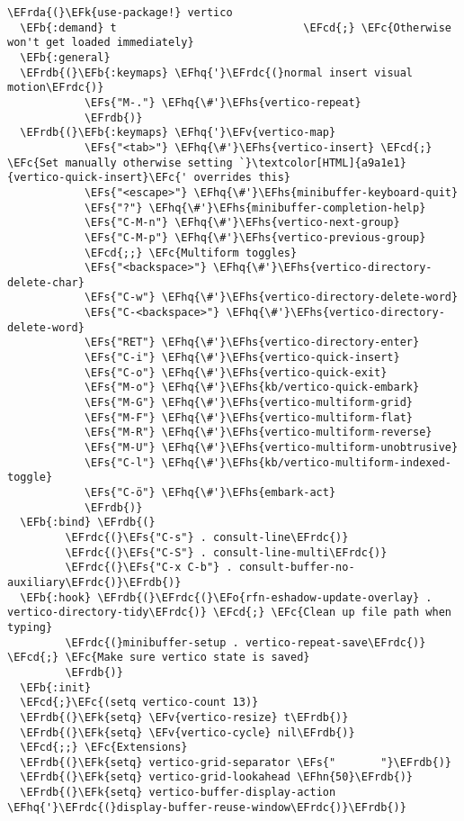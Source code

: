 \documentclass[a4wide,10pt]{article}
\newcommand{\EFc}[1]{\textcolor{EFc}{#1}} %
\newcommand{\EFcd}[1]{\textcolor{EFcd}{#1}} %
\newcommand{\EFs}[1]{\textcolor{EFs}{#1}} %
\newcommand{\EFk}[1]{\textcolor{EFk}{#1}} %
\newcommand{\EFb}[1]{\textcolor{EFb}{#1}} %
\newcommand{\EFv}[1]{\textcolor{EFv}{#1}} %
\newcommand{\EFo}[1]{\textcolor{EFo}{#1}} %
\newcommand{\EFhn}[1]{\textcolor{EFhn}{\textbf{#1}}} %
\newcommand{\EFhq}[1]{\textcolor{EFhq}{#1}} %
\newcommand{\EFhs}[1]{\textcolor{EFhs}{#1}} %
\newcommand{\EFrda}[1]{\textcolor{EFrda}{#1}} %
\newcommand{\EFrdb}[1]{\textcolor{EFrdb}{#1}} %
\newcommand{\EFrdc}[1]{\textcolor{EFrdc}{#1}} %
\begin{document}
\begin{Code}
\begin{Verbatim}
\EFrda{(}\EFk{use-package!} vertico
  \EFb{:demand} t                             \EFcd{;} \EFc{Otherwise won't get loaded immediately}
  \EFb{:general}
  \EFrdb{(}\EFb{:keymaps} \EFhq{'}\EFrdc{(}normal insert visual motion\EFrdc{)}
            \EFs{"M-."} \EFhq{\#'}\EFhs{vertico-repeat}
            \EFrdb{)}
  \EFrdb{(}\EFb{:keymaps} \EFhq{'}\EFv{vertico-map}
            \EFs{"<tab>"} \EFhq{\#'}\EFhs{vertico-insert} \EFcd{;} \EFc{Set manually otherwise setting `}\textcolor[HTML]{a9a1e1}{vertico-quick-insert}\EFc{' overrides this}
            \EFs{"<escape>"} \EFhq{\#'}\EFhs{minibuffer-keyboard-quit}
            \EFs{"?"} \EFhq{\#'}\EFhs{minibuffer-completion-help}
            \EFs{"C-M-n"} \EFhq{\#'}\EFhs{vertico-next-group}
            \EFs{"C-M-p"} \EFhq{\#'}\EFhs{vertico-previous-group}
            \EFcd{;;} \EFc{Multiform toggles}
            \EFs{"<backspace>"} \EFhq{\#'}\EFhs{vertico-directory-delete-char}
            \EFs{"C-w"} \EFhq{\#'}\EFhs{vertico-directory-delete-word}
            \EFs{"C-<backspace>"} \EFhq{\#'}\EFhs{vertico-directory-delete-word}
            \EFs{"RET"} \EFhq{\#'}\EFhs{vertico-directory-enter}
            \EFs{"C-i"} \EFhq{\#'}\EFhs{vertico-quick-insert}
            \EFs{"C-o"} \EFhq{\#'}\EFhs{vertico-quick-exit}
            \EFs{"M-o"} \EFhq{\#'}\EFhs{kb/vertico-quick-embark}
            \EFs{"M-G"} \EFhq{\#'}\EFhs{vertico-multiform-grid}
            \EFs{"M-F"} \EFhq{\#'}\EFhs{vertico-multiform-flat}
            \EFs{"M-R"} \EFhq{\#'}\EFhs{vertico-multiform-reverse}
            \EFs{"M-U"} \EFhq{\#'}\EFhs{vertico-multiform-unobtrusive}
            \EFs{"C-l"} \EFhq{\#'}\EFhs{kb/vertico-multiform-indexed-toggle}
            \EFs{"C-ö"} \EFhq{\#'}\EFhs{embark-act}
            \EFrdb{)}
  \EFb{:bind} \EFrdb{(}
         \EFrdc{(}\EFs{"C-s"} . consult-line\EFrdc{)}
         \EFrdc{(}\EFs{"C-S"} . consult-line-multi\EFrdc{)}
         \EFrdc{(}\EFs{"C-x C-b"} . consult-buffer-no-auxiliary\EFrdc{)}\EFrdb{)}
  \EFb{:hook} \EFrdb{(}\EFrdc{(}\EFo{rfn-eshadow-update-overlay} . vertico-directory-tidy\EFrdc{)} \EFcd{;} \EFc{Clean up file path when typing}
         \EFrdc{(}minibuffer-setup . vertico-repeat-save\EFrdc{)} \EFcd{;} \EFc{Make sure vertico state is saved}
         \EFrdb{)}
  \EFb{:init}
  \EFcd{;}\EFc{(setq vertico-count 13)}
  \EFrdb{(}\EFk{setq} \EFv{vertico-resize} t\EFrdb{)}
  \EFrdb{(}\EFk{setq} \EFv{vertico-cycle} nil\EFrdb{)}
  \EFcd{;;} \EFc{Extensions}
  \EFrdb{(}\EFk{setq} vertico-grid-separator \EFs{"       "}\EFrdb{)}
  \EFrdb{(}\EFk{setq} vertico-grid-lookahead \EFhn{50}\EFrdb{)}
  \EFrdb{(}\EFk{setq} vertico-buffer-display-action \EFhq{'}\EFrdc{(}display-buffer-reuse-window\EFrdc{)}\EFrdb{)}

\end{Verbatim}
\end{Code}
\end{document}
